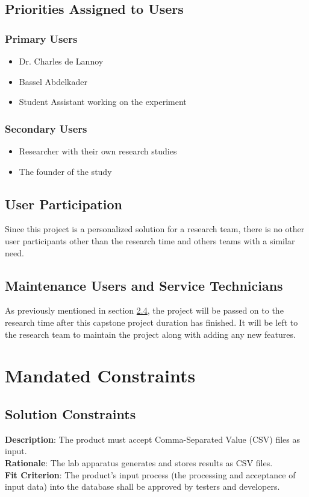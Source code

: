\documentclass[12pt]{article}
\begin{document}
\subsection{Priorities Assigned to Users}
\subsubsection{Primary Users}
\begin{itemize}
  \item Dr. Charles de Lannoy
  \item Bassel Abdelkader
  \item Student Assistant working on the experiment 
\end{itemize}

\subsubsection{Secondary Users}
\begin{itemize}
  \item Researcher with their own research studies 
  \item The founder of the study
\end{itemize}
\subsection{User Participation}
Since this project is a personalized solution for a research team, there is no
other user participants other than the research time and others teams with a
similar need. 
\subsection{Maintenance Users and Service Technicians}
As previously mentioned in section \hyperref[sec:2.4]{2.4}, the project will be passed on to the
research time after this capstone project duration has finished. It will be left
to the research team to maintain the project along with adding any new features.

\section{Mandated Constraints}
\subsection{Solution Constraints}
\textbf{Description}: The product must accept Comma-Separated Value (CSV) files as input.\\
\textbf{Rationale}: The lab apparatus generates and stores results as CSV files.\\
\textbf{Fit Criterion}: The product's input process (the processing and acceptance of input data) into the database shall be approved by testers and developers.
\end{document}
